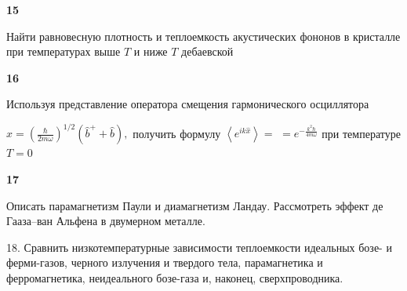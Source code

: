 \documentclass[a4paper,12pt]{article} %
\begin{document}
\begin{ttask}\textbf{15}

Найти равновесную плотность и теплоемкость акустических фононов в кристалле при температурах выше $ T $  и ниже $ T $  дебаевской




















\end{ttask}


\begin{ttask}\textbf{16}

Используя представление оператора смещения гармонического осциллятора 

$\hat{x}=\left(\frac{\hbar}{2 m \omega}\right)^{1 / 2}\left(\hat{b}^{+}+\hat{b}\right),$ 
получить формулу $\left\langle e^{i k \hat{x}}\right\rangle=$
$=e^{-\frac{k^{2} \hbar}{4 m \omega}}$ при температуре $T=0$

















\end{ttask}




\begin{ttask} \textbf{17}


Описать парамагнетизм Паули и диамагнетизм Ландау. 
Рассмотреть эффект де Гааза–ван Альфена в двумерном металле. 

















\end{ttask}


\begin{ttask}

18. Сравнить низкотемпературные зависимости теплоемкости идеальных бозе- и ферми-газов, черного излучения и твердого тела, парамагнетика и ферромагнетика, неидеального бозе-газа и, наконец, сверхпроводника. 






















\end{ttask}
\end{document}
